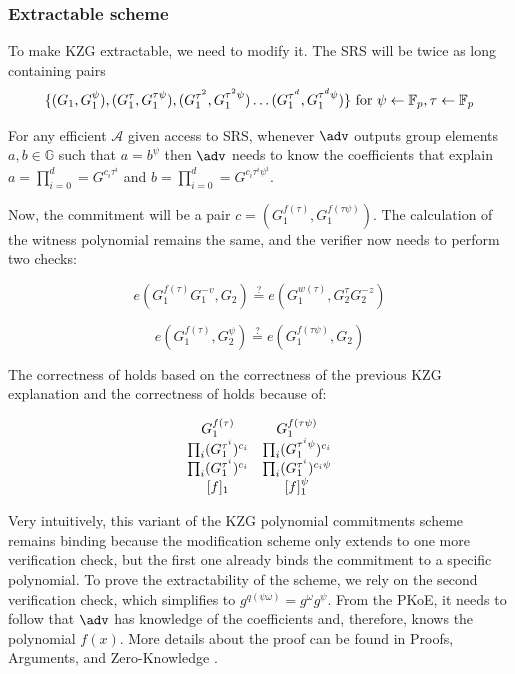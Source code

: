 \subsubsection{Extractable scheme}
To make KZG extractable, we need to modify it. The SRS will be twice as long containing pairs $$\{(G_1, G_1^{\psi}), (G_1^{\tau}, G_1^{\tau \psi}), (G_1^{\tau^2}, G_1^{\tau^2 \psi}) \ldots (G_1^{\tau^d}, G_1^{\tau^d \psi})\} \text{ for } \psi \gets \mathbb{F}_p, \tau \gets \mathbb{F}_p$$

\begin{definition}
    For any efficient $\mathcal{A}$ given access to SRS, whenever $\adv$ outputs group elements $a, b \in \mathbb{G}$ such that $a = b^{\psi}$ then  $\adv$ needs to know the coefficients that explain $a = \prod_{i=0}^d = G^{c_i \tau^i}$ and $b = \prod_{i=0}^d = G^{c_i \tau^i \psi^i}$.
\end{definition}

Now, the commitment will be a pair $c = (G_1^{f(\tau)}, G_1^{f(\tau \psi)})$. The calculation of the witness polynomial remains the same, and the verifier now needs to perform two checks:

\begin{equation}
    \label{extractability1}
    e(G_1^{f(\tau)} G_1^{-v}, G_2) \stackrel{?}{=} e(G_1^{w(\tau)}, G_2^{\tau} G_2^{-z})
\end{equation}

\begin{equation}
    \label{extractability2}
    e(G_1^{f(\tau)}, G_2^\psi) \stackrel{?}{=} e(G_1^{f(\tau \psi)}, G_2)
\end{equation}

The correctness of  holds based on the correctness of the previous KZG explanation and the correctness of  holds because of:

\[
\begin{array}{cc}
     G_1^{f(\tau)} & G_1^{f(\tau \psi)} \\
     \prod_i (G_1^{\tau^i})^{c_i} & \prod_i (G_1^{\tau^i \psi})^{c_i} \\
     \prod_i (G_1^{\tau^i})^{c_i} & \prod_i (G_1^{\tau^i})^{c_i \psi} \\
     \relax[f]_1 & [f]_1^\psi \\
\end{array}
\]

Very intuitively, this variant of the KZG polynomial commitments scheme remains binding because the modification scheme only extends to one more verification check, but the first one already binds the commitment to a specific polynomial. To prove the extractability of the scheme, we rely on the second verification check, which simplifies to $g^{q(\psi \omega)} = g^{\omega} g^{\psi}$. From the PKoE, it needs to follow that $\adv$ has knowledge of the coefficients and, therefore, knows the polynomial $f(x)$. More details about the proof can be found in Proofs, Arguments, and Zero-Knowledge \cite{ProofArgsAndZk}.


